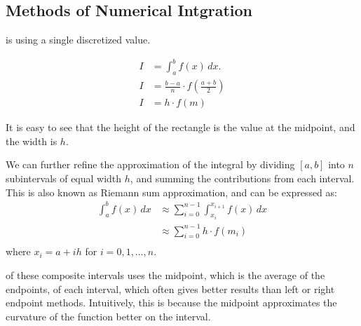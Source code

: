 
\newpage
\subsection{Methods of Numerical Intgration}
\vspace{1em}

 is using a single discretized value. 


\begin{align*}
    I &= \int_a^b f(x)\, dx. \\ 
    I &= \frac{b-a}{n} \cdot f\left(\frac{a+b}{2}\right) \\
    I &= h \cdot f(m)
\end{align*}

It is easy to see that the height of the rectangle is the value at the midpoint, and the width is $h$.

We can further refine the approximation of the integral by dividing $[a, b]$ into $n$ subintervals of equal width $h$, and summing the contributions from each interval.
This is also known as Riemann sum approximation, and can be expressed as:
\begin{align*}
    \int_a^b f(x)\, dx &\approx \sum_{i=0}^{n-1} \int_{x_i}^{x_{i+1}} f(x)\, dx \\
    &\approx \sum_{i=0}^{n-1} h \cdot f(m_i) \\
\end{align*}
where $x_i = a + i h$ for $i = 0, 1, \ldots, n$.


 of these composite intervals uses the midpoint, which is the average of the endpoints, of each interval, 
which often gives better results than left or right endpoint methods. Intuitively, this is because the midpoint approximates the curvature of the function better on the interval.

